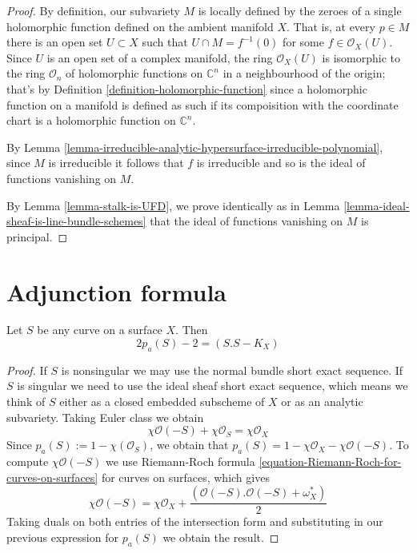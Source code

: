 \begin{proof}
By definition, our subvariety $M$ is locally defined by the zeroes of a single 
holomorphic function defined on the ambient manifold $X$. That is,
at every $p\in M$ there is an open set $U\subset X$ such that $U\cap
M=f^{-1}(0)$ for some $f\in\mathcal{O}_X(U)$. Since $U$ is an open set of a
complex manifold, the ring $\mathcal{O}_X(U)$ is isomorphic to the ring
$\mathcal{O}_n$ of holomorphic functions on $\mathbb{C}^n$ in a neighbourhood of
the origin; that's by Definition \ref{definition-holomorphic-function} since a
holomorphic function on a manifold is defined as such if its compoisition with
the coordinate chart is a holomorphic function on $\mathbb{C}^n$.

By Lemma
\ref{lemma-irreducible-analytic-hypersurface-irreducible-polynomial}, since $M$
is irreducible it follows that $f$ is irreducible and so is the ideal of
functions vanishing on $M$.

By Lemma \ref{lemma-stalk-is-UFD}, we prove identically as in Lemma 
\ref{lemma-ideal-sheaf-is-line-bundle-schemes} that the ideal of functions
vanishing on $M$ is principal.
\end{proof}

\section{Adjunction formula}
\label{section-adjunction-formula}

\begin{lemma}
\label{lemma-adjunction-formula-for-curves-on-surfaces}
Let $S$ be any curve on a surface $X$. Then
\begin{equation}
\label{equation-adjunction-formula-for-curves-on-surfaces}
2p_a(S)-2=(S.S-K_X)
\end{equation}
\end{lemma}

\begin{proof}
If $S$ is nonsingular we may use the normal bundle short exact sequence. If
$S$ is singular we need to use the ideal sheaf short exact sequence, which means
we think of $S$ either as a closed embedded subscheme of $X$ or as an analytic 
subvariety. Taking Euler class we obtain
$$
\chi\mathcal{O}(-S)+\chi\mathcal{O}_S=\chi\mathcal{O}_X
$$
Since $p_a(S):=1-\chi(\mathcal{O}_S)$, we obtain that
$p_a(S)=1-\chi\mathcal{O}_X-\chi\mathcal{O}(-S)$. To compute
$\chi\mathcal{O}(-S)$ we use Riemann-Roch formula
\ref{equation-Riemann-Roch-for-curves-on-surfaces} for curves on surfaces, which
gives
$$
\chi\mathcal{O}(-S)=\chi\mathcal{O}_X
+\frac{(\mathcal{O}(-S).\mathcal{O}(-S)+\omega_X^*)}{2}
$$
Taking duals on both entries of the intersection form and substituting in our
previous expression for $p_a(S)$ we obtain the result.
\end{proof}

